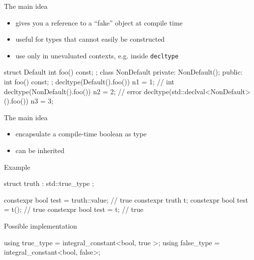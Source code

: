 \begin{frame}[fragile]
  \begin{block}{The main idea}
    \begin{itemize}
    \item gives you a reference to a ``fake'' object at compile time
    \item useful for types that cannot easily be constructed
    \item use only in unevaluated contexts, e.g. inside \texttt{decltype}
    \end{itemize}
  \end{block}
  \begin{exampleblock}{}
    \begin{cppcode*}{}
      struct Default {
        int foo() const;
      };
      class NonDefault {
        private: NonDefault();
        public:  int foo() const;
      };
      decltype(Default().foo()) n1 = 1;     // int
      decltype(NonDefault().foo()) n2 = 2; // error
      decltype(std::declval<NonDefault>().foo()) n3 = 3;
    \end{cppcode*}
  \end{exampleblock}
\end{frame}

\begin{frame}[fragile]
  \begin{block}{The main idea}
    \begin{itemize}
    \item encapsulate a compile-time boolean as type
    \item can be inherited
    \end{itemize}
  \end{block}
  \begin{exampleblock}{Example}
    \begin{cppcode*}{}
      struct truth : std::true_type { };

      constexpr bool test = truth::value; // true
      constexpr truth t;
      constexpr bool test = t(); // true
      constexpr bool test = t;   // true
    \end{cppcode*}
  \end{exampleblock}
  \begin{exampleblock}{Possible implementation}
    \begin{cppcode*}{}
      using true_type  = integral_constant<bool, true >;
      using false_type = integral_constant<bool, false>;
    \end{cppcode*}
  \end{exampleblock}
\end{frame}

